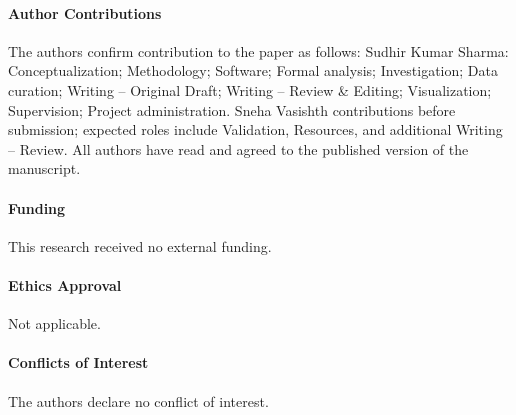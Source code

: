\documentclass[11pt]{article}
\begin{document}
\paragraph{Author Contributions} The authors confirm contribution to the paper as follows: Sudhir Kumar Sharma: Conceptualization; Methodology; Software; Formal analysis; Investigation; Data curation; Writing -- Original Draft; Writing -- Review \& Editing; Visualization; Supervision; Project administration. Sneha Vasishth contributions before submission; expected roles include Validation, Resources, and additional Writing -- Review. All authors have read and agreed to the published version of the manuscript.

\paragraph{Funding} This research received no external funding.

\paragraph{Ethics Approval} Not applicable.

\paragraph{Conflicts of Interest} The authors declare no conflict of interest.



\end{document}
